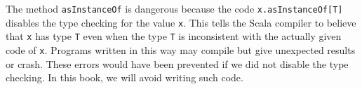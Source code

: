 The method \lstinline!asInstanceOf! is dangerous because the code
\lstinline!x.asInstanceOf[T]! disables the type checking for the
value \lstinline!x!. This tells the Scala compiler to believe that
\lstinline!x! has type \lstinline!T! even when the type \lstinline!T!
is inconsistent with the actually given code of \lstinline!x!. Programs
written in this way may compile but give unexpected results or crash.
These errors would have been prevented if we did not disable the type
checking. In this book, we will avoid writing such code.%
\begin{comment}
so suppose we we know we need this type how do we get this code turns
out mathematicians have studied this question for a long time mathematicians
were only studying the logical domain of course not the program in
domain since about 1930 or so many mathematicians have studied this
including church tarski girdle lots of people in Poland and Germany
in England and in the United States it took a very long time about
50 years between 1913 and 1980 between the beginning of this activity
when this was first formulated as logic with these particular rules
and the time when the Curie Howard respondents was realized that or
was it wasn't was discovered at that time it became clear that these
things have a direct bearing on functional programming actually helping
people to write code because if you know how to prove things here
you just directly write the code

~


\end{comment}
